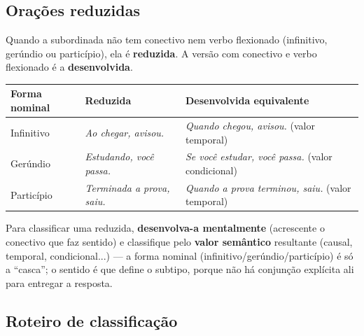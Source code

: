 \subsection{Orações reduzidas}

\begin{conceito}
Quando a subordinada não tem conectivo nem verbo flexionado (infinitivo,
gerúndio ou particípio), ela é \textbf{reduzida}. A versão com conectivo e
verbo flexionado é a \textbf{desenvolvida}.

\begin{center}
\begin{tabular}{@{}p{2.6cm}p{4.2cm}p{5.2cm}@{}}
\toprule
\textbf{Forma nominal} & \textbf{Reduzida} & \textbf{Desenvolvida equivalente} \\
\midrule
Infinitivo & \textit{Ao chegar, avisou.} & \textit{Quando chegou, avisou.} (valor temporal) \\
Gerúndio & \textit{Estudando, você passa.} & \textit{Se você estudar, você passa.} (valor condicional) \\
Particípio & \textit{Terminada a prova, saiu.} & \textit{Quando a prova terminou, saiu.} (valor temporal) \\
\bottomrule
\end{tabular}
\end{center}
\end{conceito}

\begin{regrapratica}
Para classificar uma reduzida, \textbf{desenvolva-a mentalmente} (acrescente
o conectivo que faz sentido) e classifique pelo \textbf{valor semântico}
resultante (causal, temporal, condicional...) --- a forma nominal
(infinitivo/gerúndio/particípio) é só a “casca”; o sentido é que define o
subtipo, porque não há conjunção explícita ali para entregar a resposta.
\end{regrapratica}

\subsection{Roteiro de classificação}

